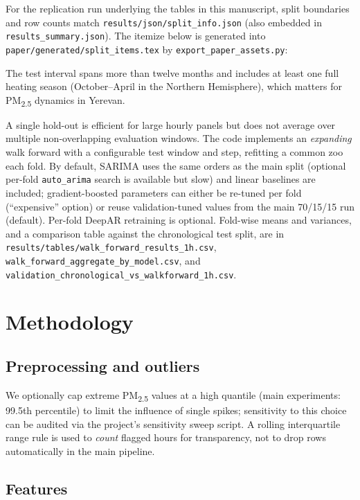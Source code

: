 \documentclass[11pt,a4paper]{article}
\begin{document}
For the replication run underlying the tables in this manuscript, split boundaries and row counts match \texttt{results/json/split\_info.json} (also embedded in \texttt{results\_summary.json}). The itemize below is generated into \texttt{paper/generated/split\_items.tex} by \texttt{export\_paper\_assets.py}:
\begin{itemize}

\end{itemize}
The test interval spans more than twelve months and includes at least one full heating season (October--April in the Northern Hemisphere), which matters for PM\textsubscript{2.5} dynamics in Yerevan.

A single hold-out is efficient for large hourly panels but does not average over multiple non-overlapping evaluation windows. The code implements an \emph{expanding} walk forward with a configurable test window and step, refitting a common zoo each fold. By default, SARIMA uses the same orders as the main split (optional per-fold \texttt{auto\_arima} search is available but slow) and linear baselines are included; gradient-boosted parameters can either be re-tuned per fold (``expensive'' option) or reuse validation-tuned values from the main 70/15/15 run (default). Per-fold DeepAR retraining is optional. Fold-wise means and variances, and a comparison table against the chronological test split, are in \texttt{results/tables/walk\_forward\_results\_1h.csv}, \texttt{walk\_forward\_aggregate\_by\_model.csv}, and \texttt{validation\_chronological\_vs\_walkforward\_1h.csv}.

\section{Methodology}
\label{sec:methods}

\subsection{Preprocessing and outliers}

We optionally cap extreme PM\textsubscript{2.5} values at a high quantile (main experiments: 99.5th percentile) to limit the influence of single spikes; sensitivity to this choice can be audited via the project's sensitivity sweep script. A rolling interquartile range rule is used to \emph{count} flagged hours for transparency, not to drop rows automatically in the main pipeline.

\subsection{Features}
\end{document}
